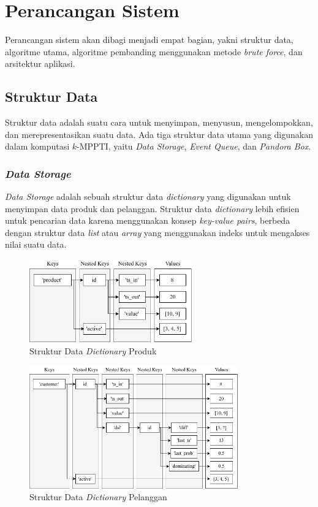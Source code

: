 \section{Perancangan Sistem}
\tab Perancangan sistem akan dibagi menjadi empat bagian, yakni struktur data, algoritme utama, algoritme pembanding menggunakan metode \textit{brute force}, dan arsitektur aplikasi. 

\subsection{Struktur Data}
\tab Struktur data adalah suatu cara untuk menyimpan, menyusun, mengelompokkan, dan merepresentasikan suatu data. Ada tiga struktur data utama yang digunakan dalam komputasi $k$-MPPTI, yaitu \textit{Data Storage}, \textit{Event Queue}, dan \textit{Pandora Box}.

\subsubsection{\textit{Data Storage}}
\tab \textit{Data Storage} adalah sebuah struktur data \textit{dictionary} yang digunakan untuk menyimpan data produk dan pelanggan. Struktur data \textit{dictionary} lebih efisien untuk pencarian data karena menggunakan konsep \textit{key-value pairs}, berbeda dengan struktur data \textit{list} atau \textit{array} yang menggunakan indeks untuk mengakses nilai suatu data.

\begin{figure}[H]
	\centering
	\includegraphics[width=7cm]{assets/img/bab3/sd1.png}
	\caption{Struktur Data \textit{Dictionary} Produk}
	\label{fig:sd1}
\end{figure}

\begin{figure}[H]
	\centering
	\includegraphics[width=9cm]{assets/img/bab3/sd2.png}
	\caption{Struktur Data \textit{Dictionary} Pelanggan}
	\label{fig:sd2}
\end{figure}


